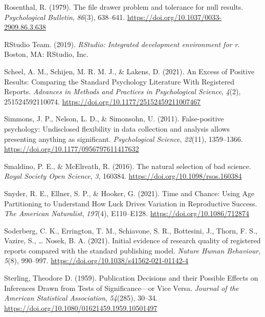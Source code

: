 \documentclass[
  ,man,mask,floatsintext]{apa6}
\newlength{\cslhangindent}
\newlength{\cslentryspacingunit} %
\newenvironment{CSLReferences}[2] %
 {%
  \setlength{\parindent}{0pt}
  \ifodd #1
  \let\oldpar\par
  \def\par{\hangindent=\cslhangindent\oldpar}
  \fi
  \setlength{\parskip}{#2\cslentryspacingunit}
 }%
 {}
\begin{document}
\begin{CSLReferences}{1}{0}
\leavevmode{}%
Rosenthal, R. (1979). The file drawer problem and tolerance for null results. \emph{Psychological Bulletin}, \emph{86}(3), 638--641. \url{https://doi.org/10.1037/0033-2909.86.3.638}

\leavevmode{}%
RStudio Team. (2019). \emph{{RStudio}: {Integrated} development environment for r}. Boston, MA: RStudio, Inc.

\leavevmode{}%
Scheel, A. M., Schijen, M. R. M. J., \& Lakens, D. (2021). An {Excess} of {Positive Results}: {Comparing} the {Standard Psychology Literature With Registered Reports}. \emph{Advances in Methods and Practices in Psychological Science}, \emph{4}(2), 251524592110074. \url{https://doi.org/10.1177/25152459211007467}

\leavevmode{}%
Simmons, J. P., Nelson, L. D., \& Simonsohn, U. (2011). False-positive psychology: {Undisclosed} flexibility in data collection and analysis allows presenting anything as significant. \emph{Psychological Science}, \emph{22}(11), 1359--1366. \url{https://doi.org/10.1177/0956797611417632}

\leavevmode{}%
Smaldino, P. E., \& McElreath, R. (2016). The natural selection of bad science. \emph{Royal Society Open Science}, \emph{3}, 160384. \url{https://doi.org/10.1098/rsos.160384}

\leavevmode{}%
Snyder, R. E., Ellner, S. P., \& Hooker, G. (2021). Time and {Chance}: {Using Age Partitioning} to {Understand How Luck Drives Variation} in {Reproductive Success}. \emph{The American Naturalist}, \emph{197}(4), E110--E128. \url{https://doi.org/10.1086/712874}

\leavevmode{}%
Soderberg, C. K., Errington, T. M., Schiavone, S. R., Bottesini, J., Thorn, F. S., Vazire, S., \ldots{} Nosek, B. A. (2021). Initial evidence of research quality of registered reports compared with the standard publishing model. \emph{Nature Human Behaviour}, \emph{5}(8), 990--997. \url{https://doi.org/10.1038/s41562-021-01142-4}

\leavevmode{}%
Sterling, Theodore D. (1959). Publication {Decisions} and their {Possible Effects} on {Inferences Drawn} from {Tests} of {Significance}---or {Vice Versa}. \emph{Journal of the American Statistical Association}, \emph{54}(285), 30--34. \url{https://doi.org/10.1080/01621459.1959.10501497}


\end{CSLReferences}
\end{document}
